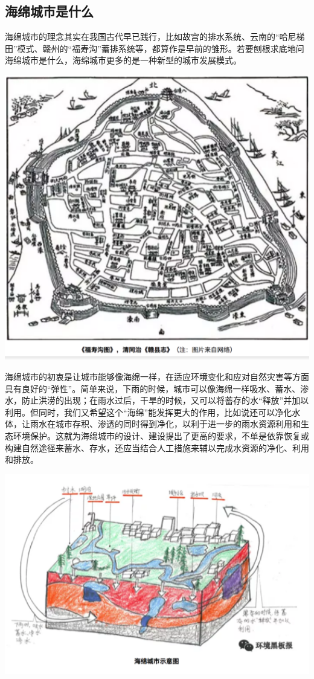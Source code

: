 \documentclass[]{book}
\begin{document}
\subsection{海绵城市是什么}

海绵城市的理念其实在我国古代早已践行，比如故宫的排水系统、云南的``哈尼梯田''模式、赣州的``福寿沟''蓄排系统等，都算作是早前的雏形。若要刨根求底地问海绵城市是什么，海绵城市更多的是一种新型的城市发展模式。

\includegraphics[width=6.67in]{images/ch2}

海绵城市的初衷是让城市能够像海绵一样，在适应环境变化和应对自然灾害等方面具有良好的``弹性''。简单来说，下雨的时候，城市可以像海绵一样吸水、蓄水、渗水，防止洪涝的出现；在雨水过后，干旱的时候，又可以将蓄存的水``释放''并加以利用。但同时，我们又希望这个``海绵''能发挥更大的作用，比如说还可以净化水体，让雨水在城市存积、渗透的同时得到净化，以利于进一步的雨水资源利用和生态环境保护。这就为海绵城市的设计、建设提出了更高的要求，不单是依靠恢复或构建自然途径来蓄水、存水，还应当结合人工措施来辅以完成水资源的净化、利用和排放。

\includegraphics[width=6.67in]{images/ch3}
\end{document}
